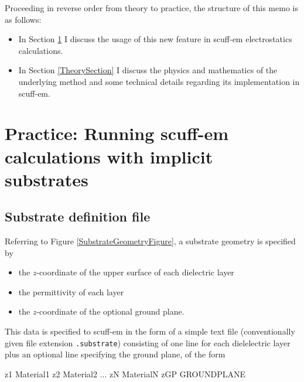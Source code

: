 \documentclass[letterpaper]{article}
\begin{document}
Proceeding in reverse order from theory to practice, the 
structure of this memo is as follows:

\begin{itemize}
\item 
In Section \ref{ImplementationSection} I discuss the usage
of this new feature in {\sc scuff-em} electrostatics calculations.

\item 
In Section \ref{TheorySection} I discuss the physics and
mathematics of the underlying method and some technical details
regarding its implementation in {\sc scuff-em}.
\end{itemize}

\newpage
\section{Practice: Running {\sc scuff-em} calculations
         with implicit substrates}
\label{ImplementationSection}

\subsection{Substrate definition file}

Referring to Figure \ref{SubstrateGeometryFigure},
a substrate geometry is specified by
\begin{itemize}
 \item the $z$-coordinate of the upper surface of each dielectric layer
 \item the permittivity of each layer
 \item the $z$-coordinate of the optional ground plane.
\end{itemize}

This data is specified to {\sc scuff-em} in the
form of a simple text file (conventionally given file
extension \texttt{.substrate}) consisting of one line for each
dielelectric layer plus an optional line specifying the ground 
plane, of the form

\medskip

\begin{verbcode}
z1  Material1
z2  Material2
...
zN  MaterialN
zGP GROUNDPLANE
\end{verbcode}
\end{document}
